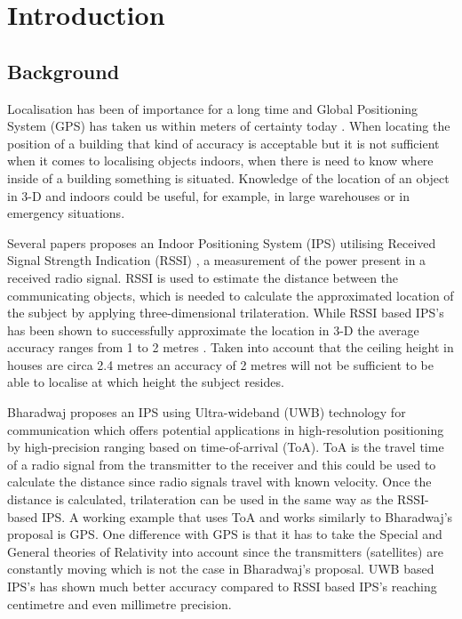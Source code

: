 
\section{Introduction}
\subsection{Background}
Localisation has been of importance for a long time and Global Positioning System (GPS) has taken us within meters of certainty today \cite{_gps.gov:_2015}. When locating the position of a building that kind of accuracy is acceptable but it is not sufficient when it comes to localising objects indoors, when there is need to know where inside of a building something is situated. Knowledge of the location of an object in 3-D and indoors could be useful, for example, in large warehouses or in emergency situations.

Several papers proposes an Indoor Positioning System (IPS) utilising Received Signal Strength Indication (RSSI) 
\cite{lee_3d-localization---mobile-beacon.pdf_2012,kim_mobile_2010,hassan_indoor_2010}, a measurement of the power present in a received radio signal. RSSI is used to estimate the distance between the communicating objects, which is needed to calculate the approximated location of the subject by applying three-dimensional trilateration. While RSSI based IPS's has been shown to successfully approximate the location in 3-D the average accuracy ranges from 1 to 2 metres \cite{hassan_indoor_2010,luo_comparative_2011}. Taken into account that the ceiling height in houses are circa 2.4 metres an accuracy of 2 metres will not be sufficient to be able to localise at which height the subject resides.

Bharadwaj proposes an IPS using Ultra-wideband (UWB) technology for communication
\cite{bharadwaj_ultrawideband-based_2014} which offers potential applications in high-resolution positioning by high-precision ranging based on time-of-arrival (ToA). ToA is the travel time of a radio signal from the transmitter to the receiver and this could be used to calculate the distance since radio signals travel with known velocity. Once the distance is calculated, trilateration can be used in the same way as the RSSI-based IPS. A working example that uses ToA and works similarly to Bharadwaj's proposal is GPS. One difference with GPS is that it has to take the Special and General theories of Relativity \cite{einstein_relativity_1920} into account since the transmitters (satellites) are constantly moving \cite{_gps_????} which is not the case in Bharadwaj's proposal. UWB based IPS's has shown much better accuracy compared to RSSI based IPS's reaching centimetre\cite{bharadwaj_ultrawideband-based_2014} and even millimetre\cite{zhang_real-time_2009} precision.

